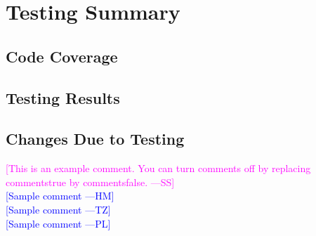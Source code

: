 \documentclass[12pt, titlepage]{article}
\newcommand{\authornote}[3]{\textcolor{#1}{[#3 ---#2]}}
\newcommand{\authornote}[3]{}
\newcommand{\wss}[1]{\authornote{magenta}{SS}{#1}}
\newcommand{\hm}[1]{\authornote{blue}{HM}{#1}} %
\newcommand{\tz}[1]{\authornote{blue}{TZ}{#1}} %
\newcommand{\pl}[1]{\authornote{blue}{PL}{#1}} %
\begin{document}
\section{Testing Summary}
\subsection{Code Coverage}
\subsection{Testing Results}
\subsection{Changes Due to Testing}

\noindent \wss{This is an example comment.  You can turn comments off by replacing
  commentstrue by commentsfalse.}\\
\hm{Sample comment}\\
\tz{Sample comment}\\
\pl{Sample comment}
\end{document}
